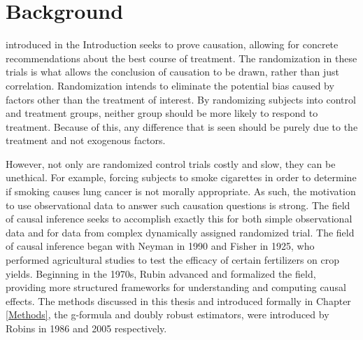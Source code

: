 
\chapter{Background}

 introduced in the Introduction seeks to prove causation, allowing for concrete recommendations about the best course of treatment.  The randomization in these trials is what allows the conclusion of causation to be drawn, rather than just correlation.  Randomization intends to eliminate the potential bias caused by factors other than the treatment of interest.  By randomizing subjects into control and treatment groups, neither group should be more likely to respond to treatment.  Because of this, any difference that is seen should be purely due to the treatment and not exogenous factors.  

However, not only are randomized control trials costly and slow, they can be unethical.  For example, forcing subjects to smoke cigarettes in order to determine if smoking causes lung cancer is not morally appropriate.  As such, the motivation to use observational data to answer such causation questions is strong.  The field of causal inference seeks to accomplish exactly this for both simple observational data and for data from complex dynamically assigned randomized trial.  The field of causal inference began with Neyman in 1990 and Fisher in 1925, who performed agricultural studies to test the efficacy of certain fertilizers on crop yields.\cite{edwards2005ra, fisher1935design, splawa1990application}  Beginning in the 1970s, Rubin advanced and formalized the field, providing more structured frameworks for understanding and computing causal effects.\cite{rosenbaum1984reducing, rubin1974estimating, rubin1978bayesian, rubin1984william} The methods discussed in this thesis and introduced formally in Chapter \ref{Methods}, the g-formula and doubly robust estimators, were introduced by Robins in 1986 and 2005 respectively.\cite{bang2005doubly, robins1986new}

